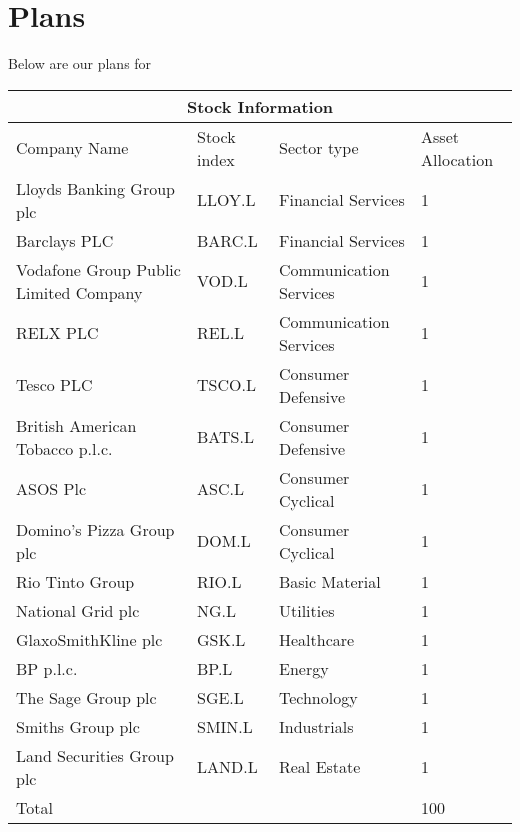 

\section{Plans}

Below are our plans for 

\begin{center}
\begin{tabular}{ |p{4cm}|p{1.5cm}|p{2.5cm}|p{2.5cm}|  }
\hline
\multicolumn{4}{|c|}{Stock Information} \\

\hline
Company Name& Stock index & Sector type & Asset Allocation\\
\hline
Lloyds Banking Group plc & LLOY.L & Financial Services & 1 \\
\hline
Barclays PLC & BARC.L & Financial Services & 1\\
\hline
Vodafone Group Public Limited Company & VOD.L & Communication Services & 1 \\
\hline
RELX PLC & REL.L & Communication Services & 1\\
\hline
Tesco PLC & TSCO.L & Consumer Defensive & 1\\
\hline
British American Tobacco p.l.c. & BATS.L & Consumer Defensive & 1\\
\hline
ASOS Plc & ASC.L & Consumer Cyclical & 1  \\
\hline
Domino's Pizza Group plc & DOM.L & Consumer Cyclical & 1\\
\hline
Rio Tinto Group & RIO.L & Basic Material & 1\\
\hline
National Grid plc & NG.L & Utilities & 1\\
\hline
GlaxoSmithKline plc & GSK.L & Healthcare & 1\\
\hline
BP p.l.c. & BP.L & Energy & 1\\
\hline
The Sage Group plc & SGE.L & Technology & 1\\
\hline
Smiths Group plc & SMIN.L & Industrials & 1\\
\hline
Land Securities Group plc & LAND.L & Real Estate & 1\\
\hline
Total & & & 100\\
\hline
\end{tabular}
\end{center}

\newpage
